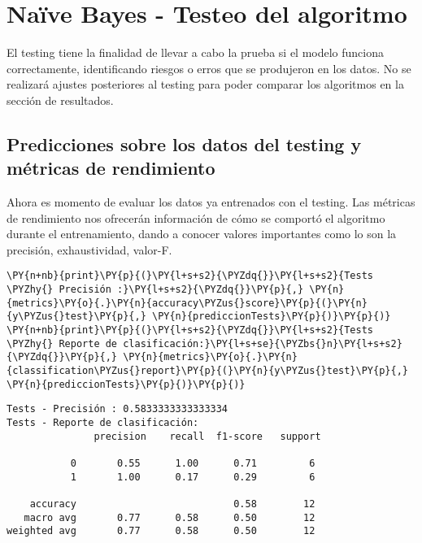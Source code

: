     \hypertarget{nauxefve-bayes---testeo-del-algoritmo}{%
\section{Naïve Bayes - Testeo del
algoritmo}\label{nauxefve-bayes---testeo-del-algoritmo}}

El testing tiene la finalidad de llevar a cabo la prueba si el modelo
funciona correctamente, identificando riesgos o erros que se produjeron
en los datos. No se realizará ajustes posteriores al testing para poder
comparar los algoritmos en la sección de resultados.

    \hypertarget{predicciones-sobre-los-datos-del-testing-y-muxe9tricas-de-rendimiento}{%
\subsection{Predicciones sobre los datos del testing y métricas de
rendimiento}\label{predicciones-sobre-los-datos-del-testing-y-muxe9tricas-de-rendimiento}}

Ahora es momento de evaluar los datos ya entrenados con el testing. Las
métricas de rendimiento nos ofrecerán información de cómo se comportó el
algoritmo durante el entrenamiento, dando a conocer valores importantes
como lo son la precisión, exhaustividad, valor-F.

    \begin{tcolorbox}[breakable, size=fbox, boxrule=1pt, pad at break*=1mm,colback=cellbackground, colframe=cellborder]
\begin{Verbatim}[commandchars=\\\{\}]
\PY{n+nb}{print}\PY{p}{(}\PY{l+s+s2}{\PYZdq{}}\PY{l+s+s2}{Tests \PYZhy{} Precisión :}\PY{l+s+s2}{\PYZdq{}}\PY{p}{,} \PY{n}{metrics}\PY{o}{.}\PY{n}{accuracy\PYZus{}score}\PY{p}{(}\PY{n}{y\PYZus{}test}\PY{p}{,} \PY{n}{prediccionTests}\PY{p}{)}\PY{p}{)}
\PY{n+nb}{print}\PY{p}{(}\PY{l+s+s2}{\PYZdq{}}\PY{l+s+s2}{Tests \PYZhy{} Reporte de clasificación:}\PY{l+s+se}{\PYZbs{}n}\PY{l+s+s2}{\PYZdq{}}\PY{p}{,} \PY{n}{metrics}\PY{o}{.}\PY{n}{classification\PYZus{}report}\PY{p}{(}\PY{n}{y\PYZus{}test}\PY{p}{,} \PY{n}{prediccionTests}\PY{p}{)}\PY{p}{)}
\end{Verbatim}
\end{tcolorbox}

    \begin{Verbatim}[commandchars=\\\{\}]
Tests - Precisión : 0.5833333333333334
Tests - Reporte de clasificación:
               precision    recall  f1-score   support

           0       0.55      1.00      0.71         6
           1       1.00      0.17      0.29         6

    accuracy                           0.58        12
   macro avg       0.77      0.58      0.50        12
weighted avg       0.77      0.58      0.50        12

    \end{Verbatim}

